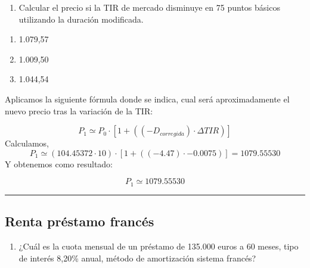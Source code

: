\documentclass[
  letterpaper,
  DIV=11,
  numbers=noendperiod]{scrreprt}
\providecommand{\tightlist}{%
  \setlength{\itemsep}{0pt}\setlength{\parskip}{0pt}}\usepackage{longtable,booktabs,array}
\begin{document}
\begin{tcolorbox}
\begin{enumerate}
\def\labelenumi{\arabic{enumi}.}
\setcounter{enumi}{1}
\tightlist
\item
  Calcular el precio si la TIR de mercado disminuye en 75 puntos básicos
  utilizando la duración modificada.
\end{enumerate}

\begin{enumerate}
\def\labelenumi{\alph{enumi}.}
\item
  1.079,57
\item
  1.009,50
\item
  1.044,54
\end{enumerate}

\begin{tcolorbox}[enhanced jigsaw, toprule=.15mm, left=2mm, breakable, opacitybacktitle=0.6, toptitle=1mm, coltitle=black, arc=.35mm, leftrule=.75mm, bottomtitle=1mm, titlerule=0mm, title=\textcolor{quarto-callout-tip-color}{\faLightbulb}\hspace{0.5em}{Solución}, rightrule=.15mm, opacityback=0, bottomrule=.15mm, colback=white, colframe=quarto-callout-tip-color-frame, colbacktitle=quarto-callout-tip-color!10!white]

Aplicamos la siguiente fórmula donde se indica, cual será
aproximadamente el nuevo precio tras la variación de la TIR:

\[P_1\simeq P_0\cdot\left[1+((-D_{corregida})\cdot\Delta TIR)\right]\]
Calculamos,
\[P_1\simeq \left(104.45372\cdot 10\right)\cdot \left[1+\left(\left(-4.47\right)\cdot -0.0075\right)\right]=1079.55530\]
Y obtenemos como resultado:

\[P_1\simeq 1079.55530\]

\end{tcolorbox}

\begin{center}\rule{0.5\linewidth}{0.5pt}\end{center}

\subsection{Renta préstamo
francés}\label{renta-pruxe9stamo-francuxe9s-1}

\begin{enumerate}
\def\labelenumi{\arabic{enumi}.}
\setcounter{enumi}{28}
\tightlist
\item
  ¿Cuál es la cuota mensual de un préstamo de 135.000 euros a 60 meses,
  tipo de interés 8,20\% anual, método de amortización sistema francés?
\end{enumerate}


\end{tcolorbox}
\end{document}
